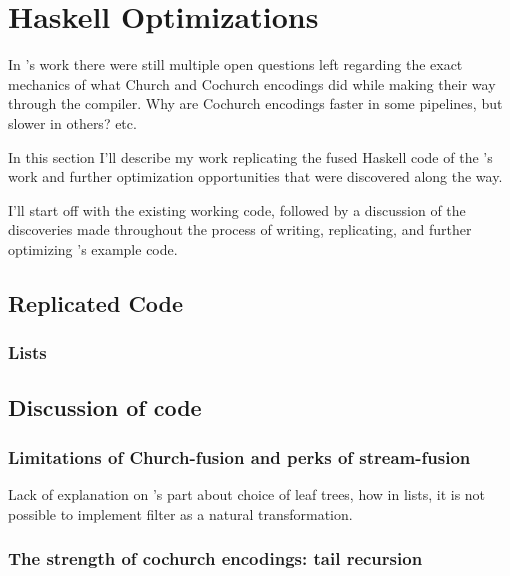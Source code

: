 
\section{Haskell Optimizations}\label{sec:haskell}
In \cite{Harper2011}'s work there were still multiple open questions left regarding the exact mechanics of what Church and Cochurch encodings did while making their way through the compiler. Why are Cochurch encodings faster in some pipelines, but slower in others? etc.

In this section I'll describe my work replicating the fused Haskell code of the \cite{Harper2011}'s work and further optimization opportunities that were discovered along the way.

I'll start off with the existing working code, followed by a discussion of the discoveries made throughout the process of writing, replicating, and further optimizing \cite{Harper2011}'s example code.

\subsection{Replicated Code}
\subsubsection{Lists}

\subsection{Discussion of code}
\subsubsection{Limitations of Church-fusion and perks of stream-fusion}\label{sec:tail}
Lack of explanation on \cite{Harper2011}'s part about choice of leaf trees, how in lists, it is not possible to implement filter as a natural transformation.
\subsubsection{The strength of cochurch encodings: tail recursion}



\iffalse
One question that comes up is: Yes this fusion is nice, but how does the fused code actually provide a speedup, isn't the language already lazy and therefore not ripe for such a speedup? What are Haskell's other optimizations that come into play that pushes the shortcut fusion over the finish as a fast optimization?
\fi




